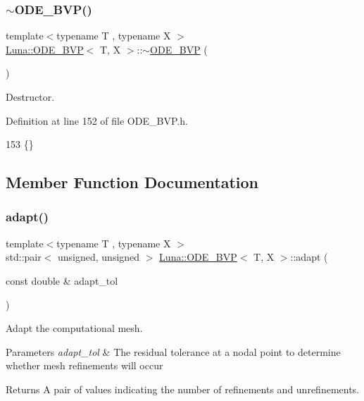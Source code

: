 \subsubsection{\texorpdfstring{$\sim$\+O\+D\+E\+\_\+\+B\+V\+P()}{~ODE\_BVP()}}
{\footnotesize\ttfamily template$<$typename T , typename X $>$ \\
\hyperlink{classLuna_1_1ODE__BVP}{Luna\+::\+O\+D\+E\+\_\+\+B\+VP}$<$ T, X $>$\+::$\sim$\hyperlink{classLuna_1_1ODE__BVP}{O\+D\+E\+\_\+\+B\+VP} (\begin{DoxyParamCaption}{ }\end{DoxyParamCaption})\hspace{0.3cm}{\ttfamily [virtual]}}



Destructor. 



Definition at line 152 of file O\+D\+E\+\_\+\+B\+V\+P.\+h.


\begin{DoxyCode}
153     \{\}
\end{DoxyCode}


\subsection{Member Function Documentation}
\mbox{\label{classLuna_1_1ODE__BVP_af132e3f1f22a87bd2505c556cd6e0993}} 
\subsubsection{\texorpdfstring{adapt()}{adapt()}\hspace{0.1cm}{\footnotesize\ttfamily [1/3]}}
{\footnotesize\ttfamily template$<$typename T , typename X $>$ \\
std\+::pair$<$ unsigned, unsigned $>$ \hyperlink{classLuna_1_1ODE__BVP}{Luna\+::\+O\+D\+E\+\_\+\+B\+VP}$<$ T, X $>$\+::adapt (\begin{DoxyParamCaption}\item[{const double \&}]{adapt\+\_\+tol }\end{DoxyParamCaption})}



Adapt the computational mesh. 


\begin{DoxyParams}{Parameters}
{\em adapt\+\_\+tol} & The residual tolerance at a nodal point to determine whether mesh refinements will occur \\
\hline
\end{DoxyParams}
\begin{DoxyReturn}{Returns}
A pair of values indicating the number of refinements and unrefinements. 
\end{DoxyReturn}


